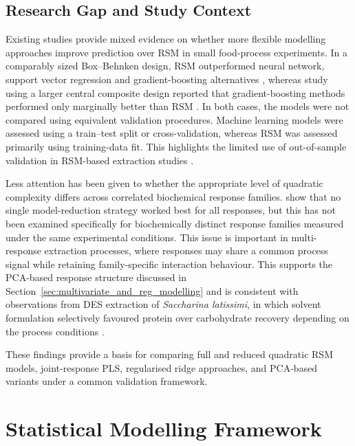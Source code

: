 \documentclass[MScDSA]{uccthesis}
\begin{document}
\section{Research Gap and Study Context}
\label{sec:research_gap}
Existing studies provide mixed evidence on whether more flexible modelling approaches improve prediction over RSM in small food-process experiments. In a comparably sized Box--Behnken design, RSM outperformed neural network, support vector regression and gradient-boosting alternatives \parencite{Mehdaoui:2025}, whereas study using a larger central composite design reported that gradient-boosting methods performed only marginally better than RSM \parencite{Ahmad:2024}. In both cases, the models were not compared using equivalent validation procedures. Machine learning models were assessed using a train--test split or cross-validation, whereas RSM was assessed primarily using training-data fit. This highlights the limited use of out-of-sample validation in RSM-based extraction studies \parencite{CanoLamadrid:2023}.

Less attention has been given to whether the appropriate level of quadratic complexity differs across correlated biochemical response families. \parencite{Smucker:2021} show that no single model-reduction strategy worked best for all responses, but this has not been examined specifically for biochemically distinct response families measured under the same experimental conditions. This issue is important in multi-response extraction processes, where responses may share a common process signal while retaining family-specific interaction behaviour. This supports the PCA-based response structure discussed in Section~\ref{sec:multivariate_and_reg_modelling} and is consistent with observations from DES extraction of \textit{Saccharina latissimi}, in which solvent formulation selectively favoured protein over carbohydrate recovery depending on the process conditions \parencite{Moldes:2024}.

These findings provide a basis for comparing full and reduced quadratic RSM models, joint-response PLS, regularised ridge approaches, and PCA-based variants under a common validation framework.


\chapter{Statistical Modelling Framework}
\label{chap:methodology}
\end{document}
